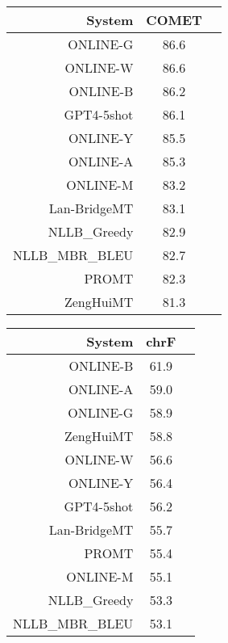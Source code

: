 \documentclass[11pt]{article}
\begin{document}
\begin{table}  
\scriptsize
\begin{subtable}[t]{0.33\textwidth}
\begin{tabular}{rcc}
\toprule 
System  & COMET \\ 
\midrule 
\rowcolor{ashgrey} ONLINE-G  & 86.6 \\ 
\rowcolor{ashgrey} ONLINE-W  & 86.6 \\ 
\rowcolor{ashgrey} ONLINE-B  & 86.2 \\ 
\rowcolor{ashgrey} GPT4-5shot  & 86.1 \\ 
\rowcolor{ashgrey} ONLINE-Y  & 85.5 \\ 
\rowcolor{ashgrey} ONLINE-A  & 85.3 \\ 
\rowcolor{ashgrey} ONLINE-M  & 83.2 \\ 
\rowcolor{ashgrey} Lan-BridgeMT & 83.1 \\ 
\rowcolor{ashgrey} NLLB\_Greedy & 82.9 \\ 
\rowcolor{ashgrey} NLLB\_MBR\_BLEU  & 82.7 \\ 
\rowcolor{ashgrey} PROMT & 82.3 \\ 
\rowcolor{ashgrey} ZengHuiMT  & 81.3 \\ 
\bottomrule 
\end{tabular} 
\end{subtable}
\begin{subtable}[t]{0.33\textwidth}
\begin{tabular}{rcc}
\toprule 
System  & chrF \\ 
\midrule 
\rowcolor{ashgrey} ONLINE-B  & 61.9 \\ 
\rowcolor{ashgrey} ONLINE-A  & 59.0 \\ 
\rowcolor{ashgrey} ONLINE-G  & 58.9 \\ 
\rowcolor{ashgrey} ZengHuiMT  & 58.8 \\ 
\rowcolor{ashgrey} ONLINE-W  & 56.6 \\ 
\rowcolor{ashgrey} ONLINE-Y  & 56.4 \\ 
\rowcolor{ashgrey} GPT4-5shot  & 56.2 \\ 
\rowcolor{ashgrey} Lan-BridgeMT  & 55.7 \\ 
\rowcolor{ashgrey} PROMT  & 55.4 \\ 
\rowcolor{ashgrey} ONLINE-M  & 55.1 \\ 
\rowcolor{ashgrey} NLLB\_Greedy  & 53.3 \\ 
\rowcolor{ashgrey} NLLB\_MBR\_BLEU  & 53.1 \\ 

\end{tabular}
\end{subtable}
\end{table}
\end{document}
